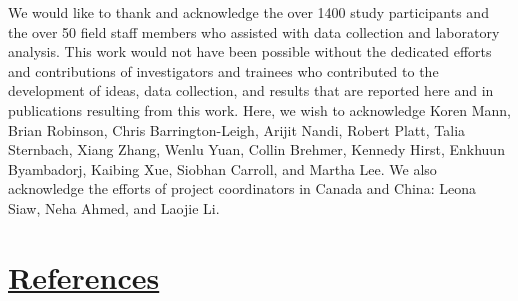 \documentclass[
  letterpaper,
  DIV=11,
  numbers=noendperiod]{scrartcl}
\providecommand{\DIFadd}[1]{{\protect\color{blue}\underline{#1}}} %
\providecommand{\DIFaddbegin}{} %
\providecommand{\DIFaddend}{} %
\providecommand{\DIFdelbegin}{} %
\providecommand{\DIFdelend}{} %
\newcommand{\DIFscaledelfig}{0.5}
\newlength{\DIFdelgraphicswidth} %
\newlength{\DIFdelgraphicsheight} %
\newcommand{\DIFaddincludegraphics}[2][]{{\color{blue}\fbox{\DIFOincludegraphics[#1]{#2}}}} %
\newcommand{\DIFdelincludegraphics}[2][]{%
\sbox{\DIFdelgraphicsbox}{\DIFOincludegraphics[#1]{#2}}%
\settoboxwidth{\DIFdelgraphicswidth}{\DIFdelgraphicsbox} %
\settoboxtotalheight{\DIFdelgraphicsheight}{\DIFdelgraphicsbox} %
\scalebox{\DIFscaledelfig}{%
\parbox[b]{\DIFdelgraphicswidth}{\usebox{\DIFdelgraphicsbox}\\[-\baselineskip] \rule{\DIFdelgraphicswidth}{0em}}\llap{\resizebox{\DIFdelgraphicswidth}{\DIFdelgraphicsheight}{%
\setlength{\unitlength}{\DIFdelgraphicswidth}%
\begin{picture}(1,1)%
\thicklines\linethickness{2pt} %
{\color[rgb]{1,0,0}\put(0,0){\framebox(1,1){}}}%
{\color[rgb]{1,0,0}\put(0,0){\line( 1,1){1}}}%
{\color[rgb]{1,0,0}\put(0,1){\line(1,-1){1}}}%
\end{picture}%
}\hspace*{3pt}}} %
} %
\DeclareRobustCommand{\DIFaddbegin}{\DIFOaddbegin \let\includegraphics\DIFaddincludegraphics} %
\DeclareRobustCommand{\DIFaddend}{\DIFOaddend \let\includegraphics\DIFOincludegraphics} %
\DeclareRobustCommand{\DIFdelbegin}{\DIFOdelbegin \let\includegraphics\DIFdelincludegraphics} %
\DeclareRobustCommand{\DIFdelend}{\DIFOaddend \let\includegraphics\DIFOincludegraphics} %
\begin{document}
We would like to thank and acknowledge the over 1400 study participants
and the over 50 field staff members who assisted with data collection
and laboratory analysis. This work would not have been possible without
the dedicated efforts and contributions of investigators and trainees
who contributed to the development of ideas, data collection, and
results that are reported here and in publications resulting from this
work. Here, we wish to acknowledge Koren Mann, Brian Robinson, Chris
Barrington-Leigh, Arijit Nandi, Robert Platt, Talia Sternbach, Xiang
Zhang, Wenlu Yuan, Collin Brehmer, Kennedy Hirst, Enkhuun Byambadorj,
Kaibing Xue, Siobhan Carroll, and Martha Lee. We also acknowledge the
efforts of project coordinators in Canada and China: Leona Siaw, Neha
Ahmed, and Laojie Li.

\DIFdelbegin %
\DIFdelend \DIFaddbegin \section{\DIFadd{References}}\label{references}
\DIFaddend 
\end{document}
